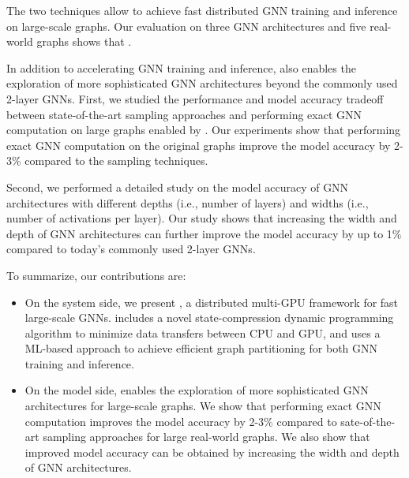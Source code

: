 
The two techniques allow \Sys to achieve fast distributed GNN training and inference on large-scale graphs.
Our evaluation on three GNN architectures and five real-world graphs shows that .

In addition to accelerating GNN training and inference, \Sys also enables the exploration of more sophisticated GNN architectures beyond the commonly used 2-layer GNNs.
First, we studied the performance and model accuracy tradeoff between state-of-the-art sampling approaches and performing exact GNN computation on large graphs enabled by \Sys.
Our experiments show that performing exact GNN computation on the original graphs improve the model accuracy by 2-3\% compared to the sampling techniques.

%
Second, we performed a detailed study on the model accuracy of GNN architectures with different depths (i.e., number of layers) and widths (i.e., number of activations per layer).
Our study shows that increasing the width and depth of GNN architectures can further improve the model accuracy by up to 1\% compared to today's commonly used 2-layer GNNs.

To summarize, our contributions are:
\begin{itemize}
\item On the system side, we present \Sys, a distributed multi-GPU framework for fast large-scale GNNs.
\Sys includes a novel state-compression dynamic programming algorithm to minimize data transfers between CPU and GPU,
 and uses a ML-based approach to achieve efficient graph partitioning for both GNN training and inference.
\item On the model side, \Sys enables the exploration of more sophisticated GNN architectures for large-scale graphs. 
We show that performing exact GNN computation improves the model accuracy by 2-3\% compared to sate-of-the-art sampling approaches for large real-world graphs.
We also show that improved model accuracy can be obtained by increasing the width and depth of GNN architectures. 
\end{itemize}

